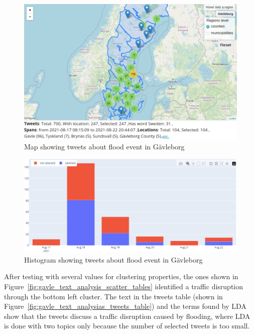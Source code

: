 \begin{figure}[H]
  \begin{center}
    \includegraphics[width=14cm]{./images/gavle_map.png}
  \end{center}
  \caption{Map showing tweets about flood event in Gävleborg}
  \label{fig:gavle_map}
\end{figure}

\begin{figure}[H]
  \begin{center}
    \includegraphics[width=12cm]{./images/gavle_histogram.png}
  \end{center}
  \caption{Histogram showing tweets about flood event in Gävleborg}
  \label{fig:gavle_histogram}
\end{figure}


After testing with several values for clustering properties, the ones shown in
Figure~\ref{fig:gavle_text_analysis_scatter_tables} identified a traffic disruption through the
bottom left cluster. The text in the tweets table (shown in
Figure~\ref{fig:gavle_text_analysias_tweets_table}) and the terms found by \ac{LDA} show that the
tweets discuss a traffic disruption caused by flooding, where \ac{LDA} is done with two topics only
because the number of selected tweets is too small.

